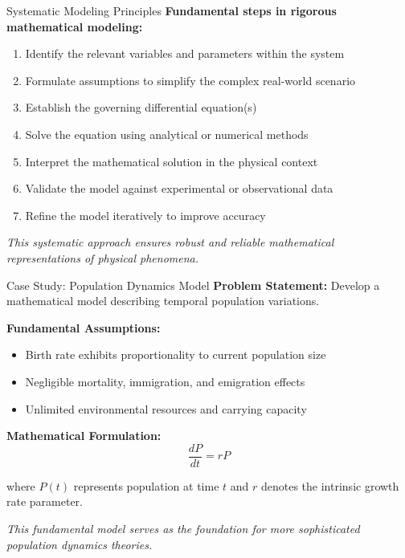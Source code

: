 \documentclass[10pt,aspectratio=169]{beamer}
\newcommand{\concept}[1]{\textbf{#1}}
\newcommand{\emphasis}[1]{\textit{#1}}
\begin{document}
\begin{frame}{Systematic Modeling Principles}
    \concept{Fundamental steps in rigorous mathematical modeling:}
    
    \vspace{0.3cm}
    
    \begin{enumerate}
        \item Identify the relevant variables and parameters within the system
        \item Formulate assumptions to simplify the complex real-world scenario
        \item Establish the governing differential equation(s)
        \item Solve the equation using analytical or numerical methods
        \item Interpret the mathematical solution in the physical context
        \item Validate the model against experimental or observational data
        \item Refine the model iteratively to improve accuracy
    \end{enumerate}
    
    \vspace{0.3cm}
    
    \emphasis{This systematic approach ensures robust and reliable mathematical representations of physical phenomena.}
\end{frame}

\begin{frame}{Case Study: Population Dynamics Model}
    \concept{Problem Statement:} Develop a mathematical model describing temporal population variations.
    
    \vspace{0.3cm}
    
    \concept{Fundamental Assumptions:}
    \begin{itemize}
        \item Birth rate exhibits proportionality to current population size
        \item Negligible mortality, immigration, and emigration effects
        \item Unlimited environmental resources and carrying capacity
    \end{itemize}
    
    \vspace{0.3cm}
    
    \concept{Mathematical Formulation:}
    \begin{equation}
        \frac{dP}{dt} = rP
    \end{equation}
    
    where $P(t)$ represents population at time $t$ and $r$ denotes the intrinsic growth rate parameter.
    
    \vspace{0.2cm}
    
    \emphasis{This fundamental model serves as the foundation for more sophisticated population dynamics theories.}
\end{frame}
\end{document}
